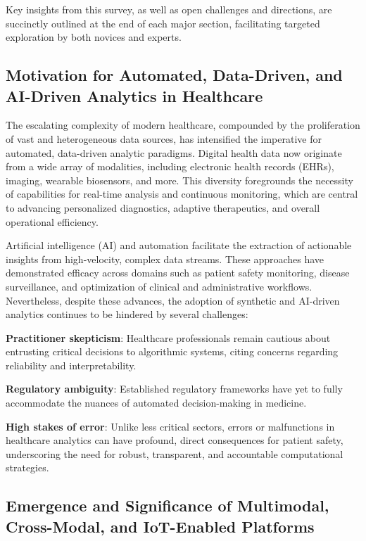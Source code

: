\documentclass[sigconf]{acmart}
\begin{document}
Key insights from this survey, as well as open challenges and directions, are succinctly outlined at the end of each major section, facilitating targeted exploration by both novices and experts.

\subsection{Motivation for Automated, Data-Driven, and AI-Driven Analytics in Healthcare}

The escalating complexity of modern healthcare, compounded by the proliferation of vast and heterogeneous data sources, has intensified the imperative for automated, data-driven analytic paradigms. Digital health data now originate from a wide array of modalities, including electronic health records (EHRs), imaging, wearable biosensors, and more. This diversity foregrounds the necessity of capabilities for real-time analysis and continuous monitoring, which are central to advancing personalized diagnostics, adaptive therapeutics, and overall operational efficiency.

Artificial intelligence (AI) and automation facilitate the extraction of actionable insights from high-velocity, complex data streams. These approaches have demonstrated efficacy across domains such as patient safety monitoring, disease surveillance, and optimization of clinical and administrative workflows. Nevertheless, despite these advances, the adoption of synthetic and AI-driven analytics continues to be hindered by several challenges:

\textbf{Practitioner skepticism}: Healthcare professionals remain cautious about entrusting critical decisions to algorithmic systems, citing concerns regarding reliability and interpretability.

\textbf{Regulatory ambiguity}: Established regulatory frameworks have yet to fully accommodate the nuances of automated decision-making in medicine.

\textbf{High stakes of error}: Unlike less critical sectors, errors or malfunctions in healthcare analytics can have profound, direct consequences for patient safety, underscoring the need for robust, transparent, and accountable computational strategies.

\subsection{Emergence and Significance of Multimodal, Cross-Modal, and IoT-Enabled Platforms}
\end{document}
